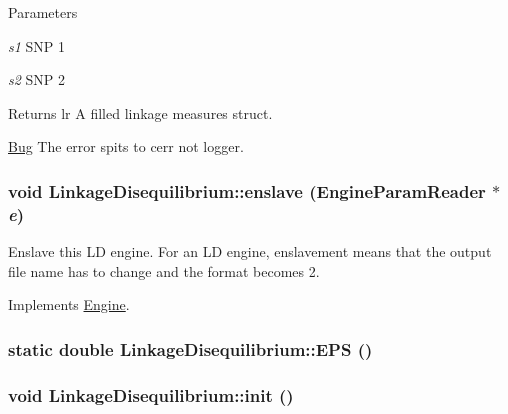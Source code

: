\begin{DoxyParams}{Parameters}
\item[{\em s1}]SNP 1 \item[{\em s2}]SNP 2 \end{DoxyParams}
\begin{DoxyReturn}{Returns}
lr A filled linkage measures struct.
\end{DoxyReturn}
\begin{Desc}
\item[\hyperlink{bug__bug000001}{Bug}]The error spits to cerr not logger. \end{Desc}
\hypertarget{classLinkageDisequilibrium_afb777d3a63bbb0f2d23ce052de891023}{
\subsubsection[{enslave}]{\setlength{\rightskip}{0pt plus 5cm}void LinkageDisequilibrium::enslave ({\bf EngineParamReader} $\ast$ {\em e})}}
\label{classLinkageDisequilibrium_afb777d3a63bbb0f2d23ce052de891023}
Enslave this LD engine. For an LD engine, enslavement means that the output file name has to change and the format becomes 2. 

Implements \hyperlink{classEngine_a023e094182312b1732fe53754c2fe5cb}{Engine}.

\hypertarget{classLinkageDisequilibrium_a9920e98718ecb60c5b33c90ae2fb6c89}{
\subsubsection[{EPS}]{\setlength{\rightskip}{0pt plus 5cm}static double LinkageDisequilibrium::EPS ()}}
\label{classLinkageDisequilibrium_a9920e98718ecb60c5b33c90ae2fb6c89}
\hypertarget{classLinkageDisequilibrium_a9d3c50f9b7c3f5739ce12eb0b2068c6c}{
\subsubsection[{init}]{\setlength{\rightskip}{0pt plus 5cm}void LinkageDisequilibrium::init ()}}
\label{classLinkageDisequilibrium_a9d3c50f9b7c3f5739ce12eb0b2068c6c}


